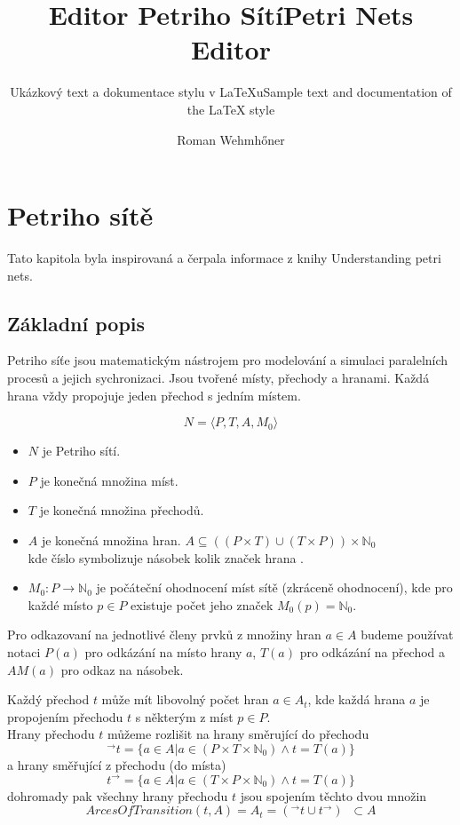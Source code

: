 \documentclass[
  biblatex,
  glossaries,
  printversion
]{kidiplom}
\title{Editor Petriho Sítí}
\title[english]{Petri Nets Editor}
\subtitle{Ukázkový text a dokumentace stylu v \LaTeX{}u}
\subtitle[english]{Sample text and documentation of the \LaTeX{} style}
\author{Roman Wehmhőner}
\begin{document}
\maketitle

\newcommand{\BibLaTeX}{\textsc{Bib}\LaTeX}
\newcommand{\todo}[1]{\textcolor{red}{TODO: #1}\PackageWarning{TODO:}{#1!}}



\section{Petriho sítě}
Tato kapitola byla inspirovaná a čerpala informace z knihy 
Understanding petri nets\cite{reisig2013understanding}.


\subsection{Základní popis}

Petriho síťe jsou matematickým nástrojem
pro modelování a simulaci paralelních procesů a jejich sychronizaci.
Jsou tvořené místy, přechody a hranami. Každá hrana vždy propojuje
jeden přechod s jedním místem.

\begin{definition}
  $$ N = \langle P,T,A,M_{0}\rangle $$
  \begin{itemize}
    \item $N$ je Petriho sítí.
    \item $P$ je konečná množina míst.
    \item $T$ je konečná množina přechodů.
    \item $A$ je konečná množina hran.
        $ A \subseteq ((P \times T) \cup (T \times P)) \times \mathbb{N}_0 $ \\
        kde číslo symbolizuje násobek kolik značek hrana .
    \item $M_{0} : P \rightarrow \mathbb{N}_0$ je počáteční ohodnocení míst sítě (zkráceně ohodnocení),
        kde pro každé místo $p \in P$ existuje počet jeho značek $M_{0}(p) = \mathbb{N}_0$.
  \end{itemize}
\end{definition}

Pro odkazovaní na jednotlivé členy prvků z množiny hran $a \in A$ 
budeme používat notaci $P(a)$ pro odkázání na místo hrany $a$,
$T(a)$ pro odkázání na přechod a $AM(a)$ pro odkaz na násobek.

Každý přechod $t$ může mít  libovolný počet
hran $a \in A_t$, kde každá hrana $a$ je propojením přechodu $t$ s některým z míst $p \in P$.\\
Hrany přechodu $t$ můžeme rozlišit na hrany směrující do přechodu
$$^\to t = \{a \in A | a \in (P \times T \times \mathbb{N}_0) \land t = T(a)\}$$
a hrany směřující z přechodu (do místa)
$$ t ^\to  = \{a \in A | a \in (T \times P \times \mathbb{N}_0) \land t = T(a)\}$$
dohromady pak všechny hrany přechodu $t$ jsou spojením těchto dvou množin
$$ArcesOfTransition(t,A) = A_t = (^\to t \cup t ^\to)\;\; \subset A$$
\end{document}
